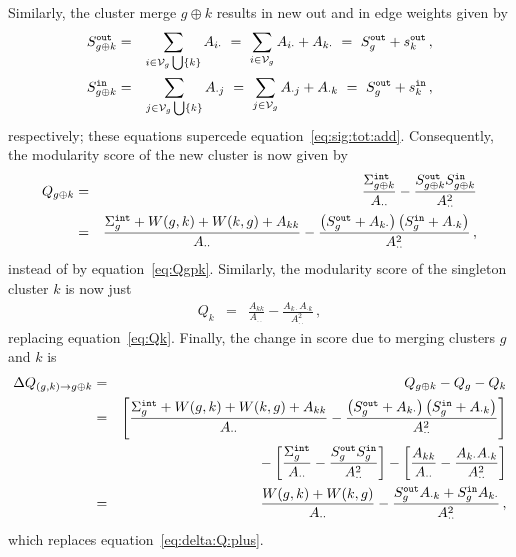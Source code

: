 \documentclass[a4paper]{article}
\begin{document}
Similarly, the cluster merge $g\oplus k$ results in new out and in edge weights given by
\begin{eqnarray}
    S_{g\oplus k}^{\tt out} & = & \sum_{i\in{\cal V}_g\bigcup\{k\}} A_{i\cdot}
~=~
    \sum_{i\in{\cal V}_g} A_{i\cdot}+A_{k\cdot}
    ~=~S_{g}^{\tt out}+s^{\tt out}_k\,,
\label{eq:S:g:k:out}
\\
    S_{g\oplus k}^{\tt in} & = & \sum_{j\in{\cal V}_g\bigcup\{k\}} A_{\cdot j}
~=~
    \sum_{j\in{\cal V}_g} A_{\cdot j}+A_{\cdot k}
    ~=~S_{g}^{\tt out}+s^{\tt in}_k\,,
\label{eq:S:g:k:in}
\end{eqnarray}
respectively; these equations supercede equation~\eqref{eq:sig:tot:add}.
Consequently, the modularity score of the new cluster is now given by
\begin{eqnarray}
Q_{g\oplus k} & = & 
\frac{\Sigma_{g\oplus k}^{\tt int}}{A_{\cdot\cdot}}
    -\frac{S_{g\oplus k}^{\tt out}S_{g\oplus k}^{\tt in}}{A_{\cdot\cdot}^2}
\nonumber\\& = &
\frac{\Sigma_{g}^{\tt int}+W(g,k)+W(k,g)+A_{kk}}{A_{\cdot\cdot}}
    -\frac{\left(S_{g}^{\tt out}+A_{k\cdot}\right)\left(S_{g}^{\tt in}+A_{\cdot k}\right)}{A_{\cdot\cdot}^2}\,,
\end{eqnarray}
instead of by equation~\eqref{eq:Qgpk}.
Similarly, the modularity score of the singleton cluster $k$ is now just
\begin{eqnarray}
    Q_k & = & \frac{A_{kk}}{A_{\cdot\cdot}}
    -\frac{A_{k\cdot}A_{\cdot k}}{A_{\cdot\cdot}^2}\,,
\end{eqnarray}
replacing equation~\eqref{eq:Qk}.
Finally, the change in score due to merging clusters $g$ and $k$ is
\begin{eqnarray}
    \Delta Q_{(g,k)\rightarrow g\oplus k} & = & Q_{g\oplus k}-Q_g-Q_k
\nonumber\\&=&
    \left[\frac{\Sigma_{g}^{\tt int}+W(g,k)+W(k,g)+A_{kk}}{A_{\cdot\cdot}}
    -\frac{\left(S_{g}^{\tt out}+A_{k\cdot}\right)\left(S_{g}^{\tt in}+A_{\cdot k}\right)}{A_{\cdot\cdot}^2}\right]
\nonumber\\&&
{}-\left[\frac{\Sigma_{g}^{\tt int}}{A_{\cdot\cdot}}
    -\frac{S_{g}^{\tt out}S_{g}^{\tt in}}{A_{\cdot\cdot}^2}\right]
    -\left[\frac{A_{kk}}{A_{\cdot\cdot}}
    -\frac{A_{k\cdot}A_{\cdot k}}{A_{\cdot\cdot}^2}\right]
\nonumber\\&=&
    \frac{W(g,k)+W(k,g)}{A_{\cdot\cdot}}-\frac{S_g^{\tt out}A_{\cdot k}+S_g^{\tt in}A_{k\cdot}}{A_{\cdot\cdot}^2}\,,
\end{eqnarray}
which replaces equation~\eqref{eq:delta:Q:plus}.
\end{document}
